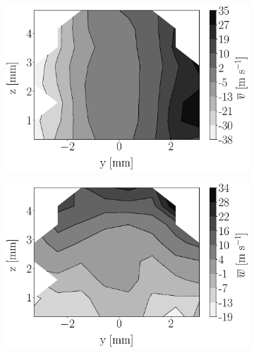\begin{figure}[h!]
\begin{subfigure}[b]{0.22\textwidth}
\end{subfigure}
   \hspace{0.17in}
\begin{subfigure}[b]{0.22\textwidth}
	\centering
   \includegraphics[scale=0.17]{./part2_developments/figures_ch5_resolved_JICF/injectors_SLI/uG100_dx20_x05_uy_mean_map.eps}
\end{subfigure}
   \hspace{0.17in}
\begin{subfigure}[b]{0.22\textwidth}
	\centering
   \includegraphics[scale=0.17]{./part2_developments/figures_ch5_resolved_JICF/injectors_SLI/uG100_dx20_x05_uz_mean_map.eps}
\end{subfigure}


\end{figure}
